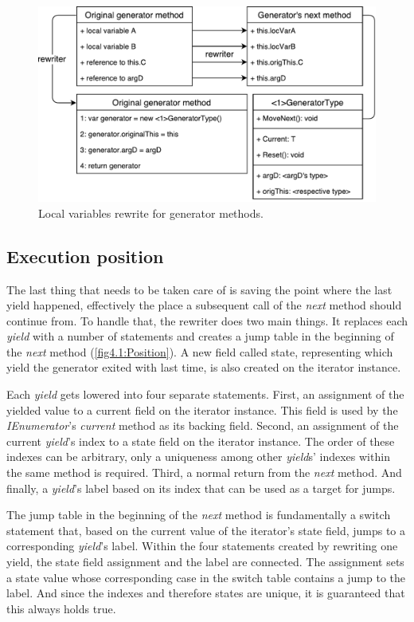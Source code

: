 \begin{figure}[h]
	\centering	
	\includegraphics[scale=0.70]{../img/4_1_localVars}	
	\caption{Local variables rewrite for generator methods.}
	\label{fig4.1:LocVars}
\end{figure}

\subsection{Execution position}

The last thing that needs to be taken care of is saving the point where the last yield happened, effectively the place a subsequent call of the \emph{next} method should continue from. To handle that, the rewriter does two main things. It replaces each \emph{yield} with a number of statements and creates a jump table in the beginning of the \emph{next} method (\autoref{fig4.1:Position}). A new field called state, representing which yield the generator exited with last time, is also created on the iterator instance.

Each \emph{yield} gets lowered into four separate statements. First, an assignment of the yielded value to a current field on the iterator instance. This field is used by the \emph{IEnumerator}'s \emph{current} method as its backing field. Second, an assignment of the current \emph{yield}’s index to a state field on the iterator instance. The order of these indexes can be arbitrary, only a uniqueness among other \emph{yield}s' indexes within the same method is required. Third, a normal return from the \emph{next} method. And finally, a \emph{yield}’s label based on its index that can be used as a target for jumps.

The jump table in the beginning of the \emph{next} method is fundamentally a switch statement that, based on the current value of the iterator’s state field, jumps to a corresponding \emph{yield}'s label. Within the four statements created by rewriting one yield, the state field assignment and the label are connected. The assignment sets a state value whose corresponding case in the switch table contains a jump to the label. And since the indexes and therefore states are unique, it is guaranteed that this always holds true.

